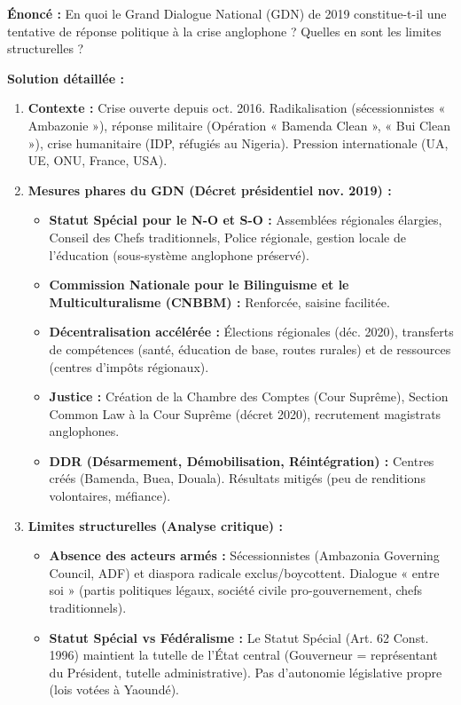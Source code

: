 \documentclass[11pt]{article}
\begin{document}
\begin{exoresolu}
\textbf{Énoncé :} En quoi le Grand Dialogue National (GDN) de 2019 constitue-t-il une tentative de réponse politique à la crise anglophone ? Quelles en sont les limites structurelles ?

\textbf{Solution détaillée :}
\begin{enumerate}
    \item \textbf{Contexte :} Crise ouverte depuis oct. 2016. Radikalisation (sécessionnistes « Ambazonie »), réponse militaire (Opération « Bamenda Clean », « Bui Clean »), crise humanitaire (IDP, réfugiés au Nigeria). Pression internationale (UA, UE, ONU, France, USA).
    \item \textbf{Mesures phares du GDN (Décret présidentiel nov. 2019) :}
    \begin{itemize}
        \item \textbf{Statut Spécial pour le N-O et S-O :} Assemblées régionales élargies, Conseil des Chefs traditionnels, Police régionale, gestion locale de l'éducation (sous-système anglophone préservé).
        \item \textbf{Commission Nationale pour le Bilinguisme et le Multiculturalisme (CNBBM) :} Renforcée, saisine facilitée.
        \item \textbf{Décentralisation accélérée :} Élections régionales (déc. 2020), transferts de compétences (santé, éducation de base, routes rurales) et de ressources (centres d'impôts régionaux).
        \item \textbf{Justice :} Création de la Chambre des Comptes (Cour Suprême), Section Common Law à la Cour Suprême (décret 2020), recrutement magistrats anglophones.
        \item \textbf{DDR (Désarmement, Démobilisation, Réintégration) :} Centres créés (Bamenda, Buea, Douala). Résultats mitigés (peu de renditions volontaires, méfiance).
    \end{itemize}
    \item \textbf{Limites structurelles (Analyse critique) :}
    \begin{itemize}
        \item \textbf{Absence des acteurs armés :} Sécessionnistes (Ambazonia Governing Council, ADF) et diaspora radicale exclus/boycottent. Dialogue « entre soi » (partis politiques légaux, société civile pro-gouvernement, chefs traditionnels).
        \item \textbf{Statut Spécial vs Fédéralisme :} Le Statut Spécial (Art. 62 Const. 1996) maintient la tutelle de l'État central (Gouverneur = représentant du Président, tutelle administrative). Pas d'autonomie législative propre (lois votées à Yaoundé).

\end{itemize}
\end{enumerate}
\end{exoresolu}
\end{document}
